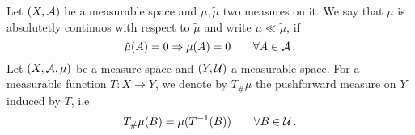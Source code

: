 \documentclass[
     12pt,         %
     a4paper,      %
     BCOR=10mm,     %
     DIV=14,        %
     ]{scrreprt}
\begin{document}
%
%
%
    
    \noindent Let $(X, \operatorname{\mathcal{A}})$ be a measurable space and $\mu, \tilde \mu$ two measures on it.  We say that $\mu$ is absolutetly continuos with respect to $\tilde \mu$ and write $\mu \ll \tilde \mu$, if
    \[\tilde \mu(A) = 0 \Rightarrow \mu(A) = 0 \quad \quad  \forall A\in \operatorname{\mathcal{A}}. \]
    Let $(X, \operatorname{\mathcal{A}}, \mu)$ be a measure space and $(Y, \operatorname{\mathcal{U}})$ a measurable space. For a measurable function $T: X \to Y $, 
    we denote by $T_{\#}\mu$ the pushforward measure on $Y$ induced by $T$, i.e
    \[T_{\#}\mu(B) = \mu(T^{-1}(B)) \quad \quad \forall B \in \operatorname{\mathcal{U}}. \]
%
%    
    \TODO{}
\end{document}
